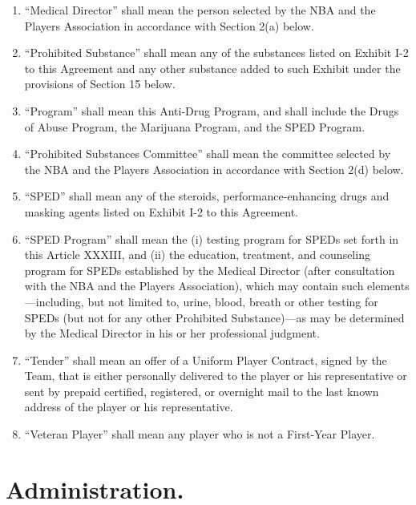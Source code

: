 \documentclass[
]{book}
\begin{document}
\begin{enumerate}
\item
  ``Medical Director'' shall mean the person selected by the NBA and the Players Association in accordance with Section 2(a) below.
\item
  ``Prohibited Substance'' shall mean any of the substances listed on Exhibit I-2 to this Agreement and any other substance added to such Exhibit under the provisions of Section 15 below.
\item
  ``Program'' shall mean this Anti-Drug Program, and shall include the Drugs of Abuse Program, the Marijuana Program, and the SPED Program.
\item
  ``Prohibited Substances Committee'' shall mean the committee selected by the NBA and the Players Association in accordance with Section 2(d) below.
\item
  ``SPED'' shall mean any of the steroids, performance-enhancing drugs and masking agents listed on Exhibit I-2 to this Agreement.
\item
  ``SPED Program'' shall mean the (i) testing program for SPEDs set forth in this Article XXXIII, and (ii) the education, treatment, and counseling program for SPEDs established by the Medical Director (after consultation with the NBA and the Players Association), which may contain such elements---including, but not limited to, urine, blood, breath or other testing for SPEDs (but not for any other Prohibited Substance)---as may be determined by the Medical Director in his or her professional judgment.
\item
  ``Tender'' shall mean an offer of a Uniform Player Contract, signed by the Team, that is either personally delivered to the player or his representative or sent by prepaid certified, registered, or overnight mail to the last known address of the player or his representative.
\item
  ``Veteran Player'' shall mean any player who is not a First-Year Player.
\end{enumerate}

\hypertarget{administration.}{%
\section{Administration.}\label{administration.}}
\end{document}
